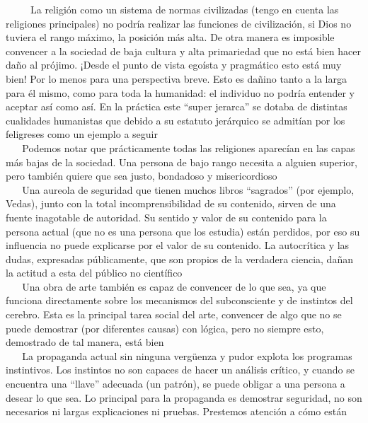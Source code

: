 ~ ~ ~ La religión como un sistema de normas civilizadas (tengo en cuenta
las religiones principales) no podría realizar las funciones de
civilización, si Dios no tuviera el rango máximo, la posición más alta.
De otra manera es imposible convencer a la sociedad de baja cultura y
alta primariedad que no está bien hacer daño al prójimo. ¡Desde el punto
de vista egoísta y pragmático esto está muy bien! Por lo menos para una
perspectiva breve. Esto es dañino tanto a la larga para él mismo, como
para toda la humanidad: el individuo no podría entender y aceptar así
como así. En la práctica este ``super jerarca'' se dotaba de distintas
cualidades humanistas que debido a su estatuto jerárquico se admitían
por los feligreses como un ejemplo a seguir\\
\hspace*{0.333em} ~ ~ Podemos notar que prácticamente todas las
religiones aparecían en las capas más bajas de la sociedad. Una persona
de bajo rango necesita a alguien superior, pero también quiere que sea
justo, bondadoso y misericordioso\\
\hspace*{0.333em} ~ ~ Una aureola de seguridad que tienen muchos libros
``sagrados'' (por ejemplo, Vedas), junto con la total incomprensibilidad
de su contenido, sirven de una fuente inagotable de autoridad. Su
sentido y valor de su contenido para la persona actual (que no es una
persona que los estudia) están perdidos, por eso su influencia no puede
explicarse por el valor de su contenido. La autocrítica y las dudas,
expresadas públicamente, que son propios de la verdadera ciencia, dañan
la actitud a esta del público no científico\\
\hspace*{0.333em} ~ ~ Una obra de arte también es capaz de convencer de
lo que sea, ya que funciona directamente sobre los mecanismos del
subconsciente y de instintos del cerebro. Esta es la principal tarea
social del arte, convencer de algo que no se puede demostrar (por
diferentes causas) con lógica, pero no siempre esto, demostrado de tal
manera, está bien\\
\hspace*{0.333em} ~ ~ La propaganda actual sin ninguna vergüenza y pudor
explota los programas instintivos. Los instintos no son capaces de hacer
un análisis crítico, y cuando se encuentra una ``llave'' adecuada (un
patrón), se puede obligar a una persona a desear lo que sea. Lo
principal para la propaganda es demostrar seguridad, no son necesarios
ni largas explicaciones ni pruebas. Prestemos atención a cómo están
